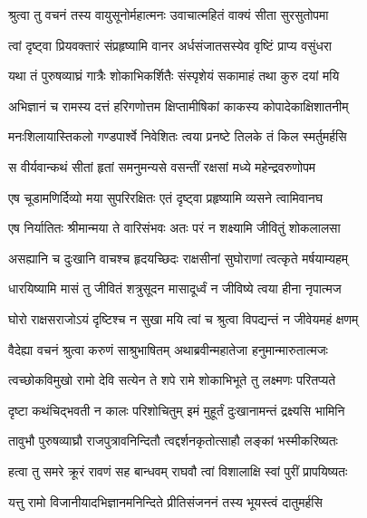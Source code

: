 
\twolineshloka
{श्रुत्वा तु वचनं तस्य वायुसूनोर्महात्मनः}
{उवाचात्महितं वाक्यं सीता सुरसुतोपमा} %

\twolineshloka
{त्वां दृष्ट्वा प्रियवक्तारं संप्रहृष्यामि वानर}
{अर्धसंजातसस्येव वृष्टिं प्राप्य वसुंधरा} %

\twolineshloka
{यथा तं पुरुषव्याघ्रं गात्रैः शोकाभिकर्शितैः}
{संस्पृशेयं सकामाहं तथा कुरु दयां मयि} %

\twolineshloka
{अभिज्ञानं च रामस्य दत्तं हरिगणोत्तम}
{क्षिप्तामीषिकां काकस्य कोपादेकाक्षिशातनीम्} %

\twolineshloka
{मनःशिलायास्तिकलो गण्डपार्श्वे निवेशितः}
{त्वया प्रनष्टे तिलके तं किल स्मर्तुमर्हसि} %

\twolineshloka
{स वीर्यवान्कथं सीतां हृतां समनुमन्यसे}
{वसन्तीं रक्षसां मध्ये महेन्द्रवरुणोपम} %

\twolineshloka
{एष चूडामणिर्दिव्यो मया सुपरिरक्षितः}
{एतं दृष्ट्वा प्रहृष्यामि व्यसने त्वामिवानघ} %

\twolineshloka
{एष निर्यातितः श्रीमान्मया ते वारिसंभवः}
{अतः परं न शक्ष्यामि जीवितुं शोकलालसा} %

\twolineshloka
{असह्यानि च दुःखानि वाचश्च हृदयच्छिदः}
{राक्षसीनां सुघोराणां त्वत्कृते मर्षयाम्यहम्} %

\twolineshloka
{धारयिष्यामि मासं तु जीवितं शत्रुसूदन}
{मासादूर्ध्वं न जीविष्ये त्वया हीना नृपात्मज} %

\twolineshloka
{घोरो राक्षसराजोऽयं दृष्टिश्च न सुखा मयि}
{त्वां च श्रुत्वा विपद्यन्तं न जीवेयमहं क्षणम्} %

\twolineshloka
{वैदेह्या वचनं श्रुत्वा करुणं साश्रुभाषितम्}
{अथाब्रवीन्महातेजा हनुमान्मारुतात्मजः} %

\twolineshloka
{त्वच्छोकविमुखो रामो देवि सत्येन ते शपे}
{रामे शोकाभिभूते तु लक्ष्मणः परितप्यते} %

\twolineshloka
{दृष्टा कथंचिद्भवती न कालः परिशोचितुम्}
{इमं मुहूर्तं दुःखानामन्तं द्रक्ष्यसि भामिनि} %

\twolineshloka
{तावुभौ पुरुषव्याघ्रौ राजपुत्रावनिन्दितौ}
{त्वद्दर्शनकृतोत्साहौ लङ्कां भस्मीकरिष्यतः} %

\twolineshloka
{हत्वा तु समरे क्रूरं रावणं सह बान्धवम्}
{राघवौ त्वां विशालाक्षि स्वां पुरीं प्रापयिष्यतः} %

\twolineshloka
{यत्तु रामो विजानीयादभिज्ञानमनिन्दिते}
{प्रीतिसंजननं तस्य भूयस्त्वं दातुमर्हसि} %

